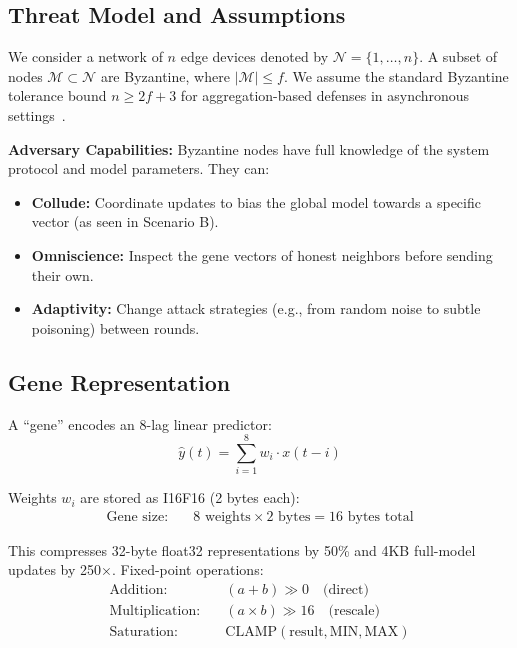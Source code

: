 \documentclass[conference,10pt]{IEEEtran}
\begin{document}
\subsection{Threat Model and Assumptions}
\label{sec:threat_model}
We consider a network of $n$ edge devices denoted by $\mathcal{N} = \{1, \dots, n\}$. A subset of nodes $\mathcal{M} \subset \mathcal{N}$ are Byzantine, where $|\mathcal{M}| \le f$. We assume the standard Byzantine tolerance bound $n \ge 2f + 3$ for aggregation-based defenses in asynchronous settings~\cite{blanchard2017machine}.

\textbf{Adversary Capabilities:} Byzantine nodes have full knowledge of the system protocol and model parameters. They can:
\begin{itemize}
    \item \textbf{Collude:} Coordinate updates to bias the global model towards a specific vector (as seen in Scenario B).
    \item \textbf{Omniscience:} Inspect the gene vectors of honest neighbors before sending their own.
    \item \textbf{Adaptivity:} Change attack strategies (e.g., from random noise to subtle poisoning) between rounds.
\end{itemize}

\subsection{Gene Representation}
A ``gene'' encodes an 8-lag linear predictor:
\begin{equation}
\hat{y}(t) = \sum_{i=1}^{8} w_i \cdot x(t-i)
\end{equation}

Weights $w_i$ are stored as I16F16 (2 bytes each):
\begin{align*}
\text{Gene size:} & \quad 8 \text{ weights} \times 2 \text{ bytes} = 16 \text{ bytes total}
\end{align*}

This compresses 32-byte float32 representations by 50\% and 4KB full-model updates by 250$\times$. Fixed-point operations:
\begin{align}
\text{Addition:} & \quad (a + b) \gg 0 \quad \text{(direct)} \\
\text{Multiplication:} & \quad (a \times b) \gg 16 \quad \text{(rescale)} \\
\text{Saturation:} & \quad \text{CLAMP}(\text{result}, \text{MIN}, \text{MAX})
\end{align}
\end{document}
